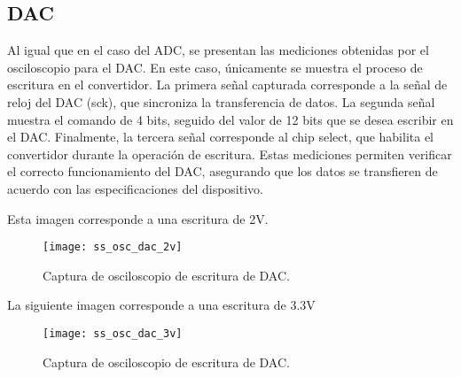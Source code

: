      
\subsection{DAC}
Al igual que en el caso del ADC, se presentan las mediciones obtenidas por el osciloscopio para el DAC. En este caso, únicamente se muestra el proceso de escritura en el convertidor. La primera señal capturada corresponde a la señal de reloj del DAC (sck), que sincroniza la transferencia de datos. La segunda señal muestra el comando de 4 bits, seguido del valor de 12 bits que se desea escribir en el DAC. Finalmente, la tercera señal corresponde al chip select, que habilita el convertidor durante la operación de escritura. Estas mediciones permiten verificar el correcto funcionamiento del DAC, asegurando que los datos se transfieren de acuerdo con las especificaciones del dispositivo.


Esta imagen corresponde a una escritura de 2V.
            \begin{figure}[hbtp]
                \centering
                \texttt{[image: ss\_osc\_dac\_2v]}
                \caption{Captura de osciloscopio de escritura de DAC.}
                \label{fig:ss_osc_dac_2v}
            \end{figure}
            
            
La siguiente imagen corresponde a una escritura de 3.3V           
            \begin{figure}[hbtp]
                \centering
                \texttt{[image: ss\_osc\_dac\_3v]}
                \caption{Captura de osciloscopio de escritura de DAC.}
                \label{fig:ss_osc_dac_3v}
            \end{figure}   
                                 
